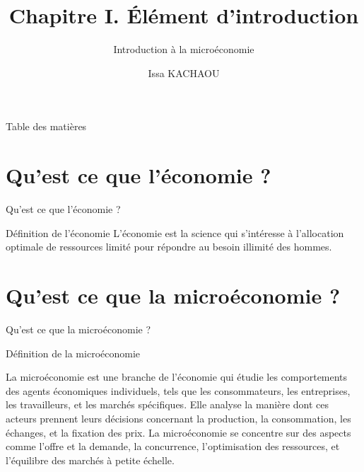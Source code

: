 \documentclass{beamer}
\title{Chapitre I. Élément d'introduction}
\subtitle{Introduction à la microéconomie}
\author{Issa KACHAOU}
\begin{document}
	\begin{frame}[plain]
		\maketitle
	\end{frame}


\begin{frame}{Table des matières}
\tableofcontents	
\end{frame}

\section{Qu'est ce que l'économie ?}
	\begin{frame}{Qu'est ce que l'économie ?}
		\begin{alertblock}{Définition de l'économie} 
		L'économie est la science qui s'intéresse à l'allocation optimale de ressources limité pour répondre au besoin illimité des hommes. 
		
		\end{alertblock}

	\end{frame}
	
\section{Qu'est ce que la microéconomie ?}
	\begin{frame}{Qu'est ce que la microéconomie ?}

\begin{alertblock}{Définition de la microéconomie} 

La microéconomie est une branche de l'économie qui étudie les comportements des agents économiques individuels, tels que les consommateurs, les entreprises, les travailleurs, et les marchés spécifiques. Elle analyse la manière dont ces acteurs prennent leurs décisions concernant la production, la consommation, les échanges, et la fixation des prix. La microéconomie se concentre sur des aspects comme l'offre et la demande, la concurrence, l'optimisation des ressources, et l'équilibre des marchés à petite échelle.
\end{alertblock}

	\end{frame}
	
\end{document}
